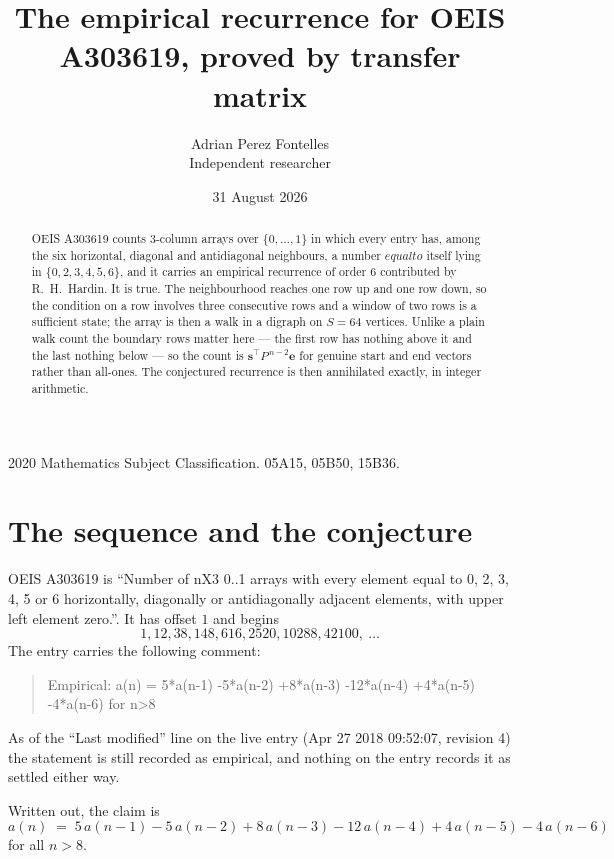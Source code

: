 \documentclass[11pt,a4paper]{article}
\title{The empirical recurrence for OEIS A303619, proved by transfer matrix}
\author{Adrian Perez Fontelles\\ \small Independent researcher}
\date{31 August 2026}
\theoremstyle{plain}
\theoremstyle{definition}
\begin{document}
\maketitle

\begin{abstract}
OEIS A303619 counts $3$-column arrays over $\{0,\dots,1\}$ in which every entry has,
among the six horizontal, diagonal and antidiagonal neighbours, a number $equal to$ itself lying in $\{0,2,3,4,5,6\}$, and it carries an empirical
recurrence of order $6$ contributed by R.~H.~Hardin. It is true. The neighbourhood
reaches one row up and one row down, so the condition on a row involves three consecutive
rows and a window of two rows is a sufficient state; the array is then a walk in a digraph
on $S=64$ vertices. Unlike a plain walk count the boundary rows matter here --- the first
row has nothing above it and the last nothing below --- so the count is
$\mathbf{s}^{\!\top}P^{\,n-2}\mathbf{e}$ for genuine start and end vectors rather than
all-ones. The conjectured recurrence is then annihilated exactly, in integer arithmetic.
\end{abstract}

\noindent\small 2020 Mathematics Subject Classification. 05A15, 05B50, 15B36.\normalsize

\section{The sequence and the conjecture}

OEIS A303619 is ``Number of nX3 0..1 arrays with every element equal to 0, 2, 3, 4, 5 or 6 horizontally, diagonally or antidiagonally adjacent elements, with upper left element zero.''. It has offset
$1$ and begins
\[
1, 12, 38, 148, 616, 2520, 10288, 42100,\ \dots
\]
The entry carries the following comment:
\begin{quote}\small
Empirical: a(n) = 5*a(n-1) -5*a(n-2) +8*a(n-3) -12*a(n-4) +4*a(n-5) -4*a(n-6) for n>8
\end{quote}
As of the ``Last modified'' line on the live entry (Apr 27 2018 09:52:07, revision
4) the statement is still recorded as empirical, and nothing on the entry
records it as settled either way.

Written out, the claim is
\begin{equation}\label{eq:conj}
a(n)\;=\;5\,a(n-1) - 5\,a(n-2) + 8\,a(n-3) - 12\,a(n-4) + 4\,a(n-5) - 4\,a(n-6)
\end{equation}
for all $n>8$.
\end{document}
